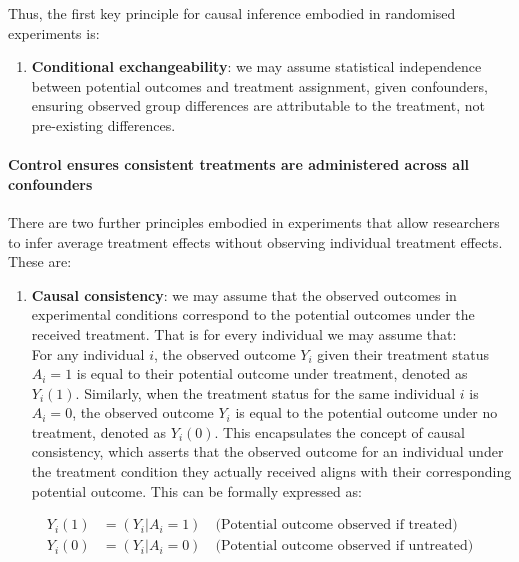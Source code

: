 \documentclass[
  singlecolumn]{article}
\let\oldparagraph\paragraph
\renewcommand{\paragraph}[1]{\oldparagraph{#1}\mbox{}}
\providecommand{\tightlist}{%
  \setlength{\itemsep}{0pt}\setlength{\parskip}{0pt}}\usepackage{longtable,booktabs,array}
\begin{document}
Thus, the first key principle for causal inference embodied in
randomised experiments is:

\begin{enumerate}
\def\labelenumi{\arabic{enumi}.}
\tightlist
\item
  \textbf{Conditional exchangeability}: we may assume statistical
  independence between potential outcomes and treatment assignment,
  given confounders, ensuring observed group differences are
  attributable to the treatment, not pre-existing differences.
\end{enumerate}

\paragraph{Control ensures consistent treatments are administered across
all
confounders}\label{control-ensures-consistent-treatments-are-administered-across-all-confounders}

There are two further principles embodied in experiments that allow
researchers to infer average treatment effects without observing
individual treatment effects. These are:

\begin{enumerate}
\def\labelenumi{\arabic{enumi}.}
\setcounter{enumi}{1}
\tightlist
\item
  \textbf{Causal consistency}: we may assume that the observed outcomes
  in experimental conditions correspond to the potential outcomes under
  the received treatment. That is for every individual we may assume
  that:\\
  For any individual \(i\), the observed outcome \(Y_i\) given their
  treatment status \(A_i = 1\) is equal to their potential outcome under
  treatment, denoted as \(Y_i(1)\). Similarly, when the treatment status
  for the same individual \(i\) is \(A_i = 0\), the observed outcome
  \(Y_i\) is equal to the potential outcome under no treatment, denoted
  as \(Y_i(0)\). This encapsulates the concept of causal consistency,
  which asserts that the observed outcome for an individual under the
  treatment condition they actually received aligns with their
  corresponding potential outcome. This can be formally expressed as:
\end{enumerate}

\[
\begin{aligned}
Y_{i}(1) &= (Y_{i}|A_{i} = 1) \quad \text{(Potential outcome observed if treated)} \\
Y_{i}(0) &= (Y_{i}|A_{i} = 0) \quad \text{(Potential outcome observed if untreated)}
\end{aligned}
\]
\end{document}
